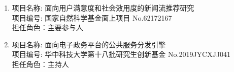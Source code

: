 \begin{project}
\renewcommand{\labelenumi}{\textbf{\arabic{enumi}.}}
   \begin{enumerate}
    \item   项目名称: 面向用户满意度和社会效用度的新闻流推荐研究 \\
            项目编号: 国家自然科学基金面上项目 No.62172167 \\
            担任角色：主要参与人 \\
            

       \item   
   项目名称: 面向电子政务平台的公共服务分发引擎 \\
   项目编号: 华中科技大学第十八批研究生创新基金 No.2019JYCXJJ041 \\
   担任角色：主持人 \\
   
   \end{enumerate}

\end{project} 